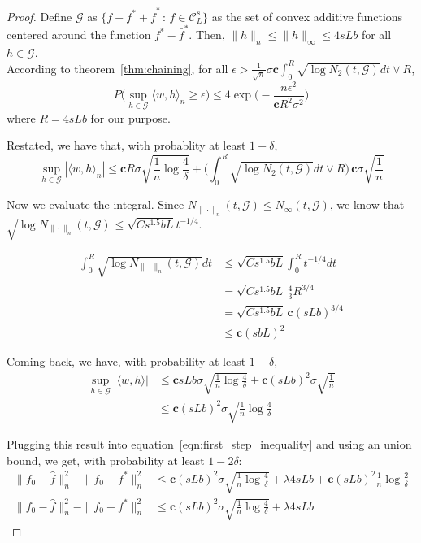 \begin{proof}
Define $\mathcal{G}$ as $\{ f - f^* + \bar{f}^* \,:\, f \in \mathcal{C}^s_L\}$ as the set of convex additive functions centered around the function $f^* - \bar{f}^*$. Then, $\| h \|_n \leq \| h \|_\infty \leq 4sLb$ for all $h \in \mathcal{G}$.\\

According to theorem~\ref{thm:chaining}, for all $\epsilon > \frac{1}{\sqrt{n}}\sigma \mathbf{c} \int_0^R \sqrt{ \log N_2(t, \mathcal{G}) }dt \vee R$,
\[
P\Big( \sup_{h \in \mathcal{G}} \langle w, h \rangle_n \geq \epsilon \Big) \leq
  4 \exp \Big( - \frac{ n \epsilon^2}{ \mathbf{c} R^2 \sigma^2} \Big)
\]
where $R = 4sLb$ for our purpose.

Restated, we have that, with probablity at least $1-\delta$,
\[
\sup_{h \in \mathcal{G}} | \langle w, h \rangle_n | \leq 
   \mathbf{c} R \sigma \sqrt{ \frac{1}{n} \log \frac{4}{\delta}} + 
      \Big( \int_0^R \sqrt{\log N_2(t, \mathcal{G})}dt \vee R \Big)\, 
       \mathbf{c} \sigma \sqrt{\frac{1}{n}} 
\]

Now we evaluate the integral. Since $N_{\|\cdot\|_n}(t, \mathcal{G}) \leq N_\infty(t, \mathcal{G})$, we know that $\sqrt{\log N_{\|\cdot\|_n}(t, \mathcal{G})} \leq \sqrt{C s^{1.5} b L} t^{-1/4}$.

\begin{align*}
\int_0^R \sqrt{\log N_{\|\cdot\|_n}(t, \mathcal{G})} dt &\leq 
      \sqrt{C s^{1.5} b L} \int_0^R t^{-1/4} dt \\ 
 &= \sqrt{C s^{1.5} b L} \, \frac{4}{3} R^{3/4} \\
 &= \sqrt{C s^{1.5} b L} \, \mathbf{c} (sLb)^{3/4} \\
 &\leq \mathbf{c} (s b L)^2
\end{align*}

Coming back, we have, with probability at least $1-\delta$,
\begin{align*}
\sup_{h \in \mathcal{G}} | \langle w, h \rangle | &\leq 
    \mathbf{c} sLb \sigma \sqrt{ \frac{1}{n} \log \frac{4}{\delta} } + 
    \mathbf{c} (sLb)^2 \sigma \sqrt{ \frac{1}{n} } \\
 &\leq \mathbf{c} (sLb)^2\sigma \sqrt{ \frac{1}{n} \log \frac{4}{\delta} }
\end{align*}

Plugging this result into equation~\ref{eqn:first_step_inequality} and using an union bound, we get, with probability at least $1 - 2\delta$:
\begin{align}
\|f_0 - \hat{f} \|_n^2 - \| f_0 - f^* \|_n^2 
   &\leq \mathbf{c} (sLb)^2 \sigma \sqrt{\frac{1}{n} \log \frac{4}{\delta}} 
   + \lambda 4 s L b + \mathbf{c}(sLb)^2 \frac{1}{n} \log \frac{2}{\delta} \nonumber\\
\|f_0 - \hat{f} \|_n^2 - \| f_0 - f^* \|_n^2 
   &\leq \mathbf{c} (sLb)^2 \sigma \sqrt{\frac{1}{n} \log \frac{4}{\delta}} 
   + \lambda 4 s L b    \label{eqn:second_step_inequality}
\end{align}


\end{proof}
